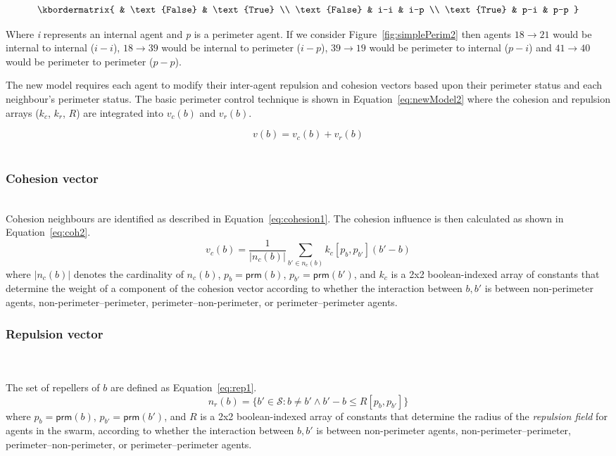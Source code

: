 \documentclass[12pt,a4paper]{IEEEtran}
\newcommand{\vbb}[2]{#2-#1}
\newcommand{\prm}{\mathsf{prm}}
\newcommand{\kc}{\mathit{k_c}}
\newcommand{\kr}{\mathit{k_r}}
\newcommand{\rb}{\mathit{R}}
\begin{document}
\[
  \kbordermatrix{
                   & \text{False} & \text{True} \\
    \text{False}   & i-i   & i-p  \\
    \text{True}    & p-i   & p-p
  }
\]

Where \emph{i} represents an internal agent and \emph{p} is a perimeter agent. If we consider Figure~\ref{fig:simplePerim2} then agents $18\rightarrow 21$ would be internal to internal ($i-i$), $18\rightarrow 39$ would be internal to perimeter ($i-p$), $39\rightarrow 19$ would be perimeter to internal ($p-i$) and $41\rightarrow 40$ would be perimeter to perimeter ($p-p$).

The new model requires each agent to modify their inter-agent repulsion and cohesion vectors based upon their perimeter status and each neighbour's perimeter status. The basic perimeter control technique is shown in Equation~\ref{eq:newModel2} where the cohesion and repulsion arrays ($\kc$, $\kr$, $\rb$) are integrated into $v_c(b)$ and $v_r(b)$.

\begin{equation}\label{eq:newModel2}
v(b) = v_c(b) + v_r(b)
\end{equation}\\

\subsubsection{Cohesion vector}~\\
Cohesion neighbours are identified as described in Equation~\ref{eq:cohesion1}. The cohesion influence is then calculated as shown in Equation~\ref{eq:coh2}.
\begin{equation}\label{eq:coh2}
	v_c(b) = \frac{1}{|n_c(b)|} \sum_{b' \in n_c(b)} \kc[p_b, p_{b'}] (b' - b)
\end{equation}
where $|n_c(b)|$ denotes the cardinality of $n_c(b)$, $p_b = \prm(b)$, $p_{b'} 
= \prm(b')$, and 
$\kc$ is a 2x2 boolean-indexed array of constants that determine the weight
of a component of the cohesion vector according to
whether the interaction between $b,b'$ is between non-perimeter agents,
non-perimeter--perimeter, perimeter--non-perimeter, or perimeter--perimeter
agents.\\

\subsubsection{Repulsion vector}~\\
~\\
The set of repellers of $b$ are defined as Equation~\ref{eq:rep1}.
\small
\begin{equation}\label{eq:rep1}
	n_r(b) = \{b' \in \mathcal{S} : b \neq b' \wedge \vbb{b}{b'} \leq \rb[p_b,p_{b'}]\}
\end{equation}
\normalsize
where $p_b = \prm(b)$, $p_{b'} = \prm(b')$, and $\rb$ is a 2x2 boolean-indexed
array of constants that determine the radius of the \emph{repulsion field} for agents in the swarm, according to whether the interaction between $b,b'$ is between non-perimeter agents, non-perimeter--perimeter,
perimeter--non-perimeter, or perimeter--perimeter agents.
\end{document}
